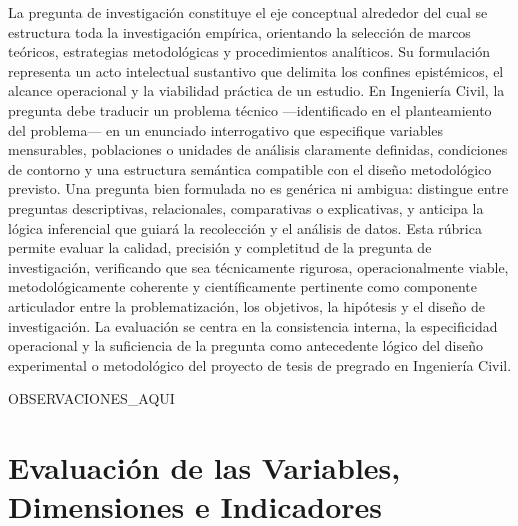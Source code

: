 \documentclass[12pt,a4paper]{report}
\begin{document}
La pregunta de investigación constituye el eje conceptual alrededor del cual se estructura toda la investigación empírica, orientando la selección de marcos teóricos, estrategias metodológicas y procedimientos analíticos. Su formulación representa un acto intelectual sustantivo que delimita los confines epistémicos, el alcance operacional y la viabilidad práctica de un estudio. En Ingeniería Civil, la pregunta debe traducir un problema técnico ---identificado en el planteamiento del problema--- en un enunciado interrogativo que especifique variables mensurables, poblaciones o unidades de análisis claramente definidas, condiciones de contorno y una estructura semántica compatible con el diseño metodológico previsto. Una pregunta bien formulada no es genérica ni ambigua: distingue entre preguntas descriptivas, relacionales, comparativas o explicativas, y anticipa la lógica inferencial que guiará la recolección y el análisis de datos. Esta rúbrica permite evaluar la calidad, precisión y completitud de la pregunta de investigación, verificando que sea técnicamente rigurosa, operacionalmente viable, metodológicamente coherente y científicamente pertinente como componente articulador entre la problematización, los objetivos, la hipótesis y el diseño de investigación. La evaluación se centra en la consistencia interna, la especificidad operacional y la suficiencia de la pregunta como antecedente lógico del diseño experimental o metodológico del proyecto de tesis de pregrado en Ingeniería Civil.



{{OBSERVACIONES_AQUI}}


\section{Evaluación de las Variables, Dimensiones e Indicadores}
\end{document}
